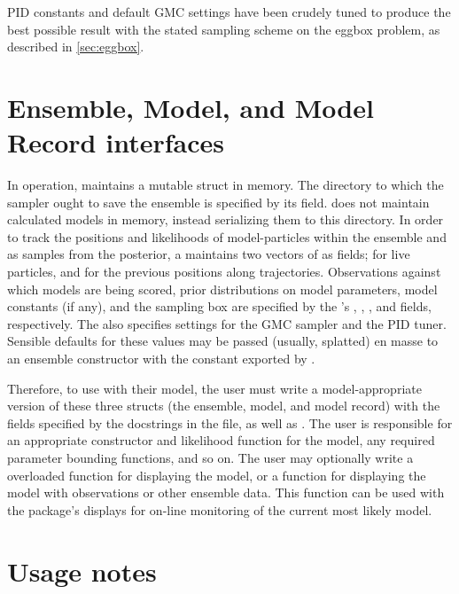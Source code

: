 PID constants and default GMC settings have been crudely tuned to produce the best possible result with the stated sampling scheme on the eggbox problem, as described in \autoref{sec:eggbox}.

\section{Ensemble, Model, and Model Record interfaces}
In operation,  maintains a  mutable struct in memory. The directory to which the sampler ought to save the ensemble is specified by its  field.  does not maintain calculated models in memory, instead serializing them to this directory. In order to track the positions and likelihoods of model-particles within the ensemble and as samples from the posterior, a  maintains two vectors of  as fields;  for live particles, and  for the previous positions along trajectories. Observations against which models are being scored, prior distributions on model parameters, model constants (if any), and the sampling box are specified by the 's , , , and  fields, respectively. The  also specifies settings for the GMC sampler and the PID tuner. Sensible defaults for these values may be passed (usually, splatted) en masse to an ensemble constructor with the  constant exported by .

Therefore, to use  with their model, the user must write a model-appropriate version of these three structs (the ensemble, model, and model record) with the fields specified by the docstrings in the  file, as well as . The user is responsible for an appropriate constructor and likelihood function for the model, any required parameter bounding functions, and so on. The user may optionally write a overloaded  function for displaying the model, or a  function for displaying the model with observations or other ensemble data. This function can be used with the package's  displays for on-line monitoring of the current most likely model.

\section{Usage notes}
